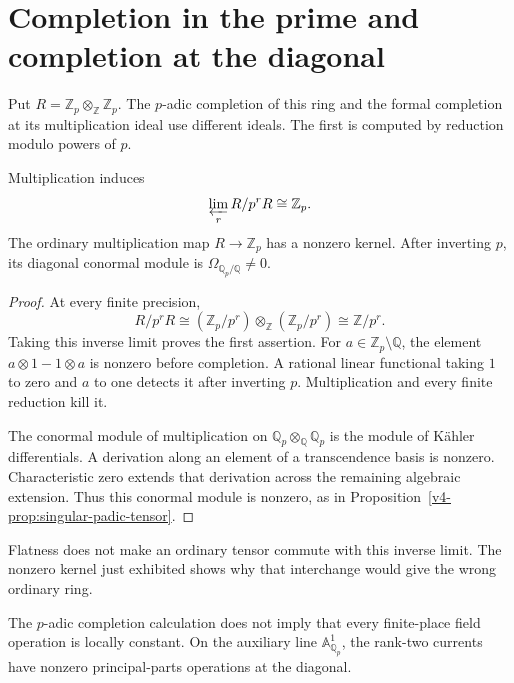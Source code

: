 \section{Completion in the prime and completion at the diagonal}
\label{v4-arith:dk:padic-diagonal-no-thickening}

Put \(R=\mathbb Z_p\otimes_{\mathbb Z}\mathbb Z_p\).
The \(p\)-adic completion of this ring and the formal completion
at its multiplication ideal use different ideals.
The first is computed by reduction modulo powers of \(p\).

\begin{proposition}\label{v4-arith:prop:padic-diagonal-collapse}
Multiplication induces
\[
        \varprojlim_r R/p^rR\cong\mathbb Z_p.
\]
The ordinary multiplication map \(R\to\mathbb Z_p\) has a
nonzero kernel. After inverting \(p\), its diagonal conormal
module is \(\Omega_{\mathbb Q_p/\mathbb Q}\ne0\).
\end{proposition}

\begin{proof}
At every finite precision,
\[
 R/p^rR\cong
     (\mathbb Z_p/p^r)\otimes_{\mathbb Z}(\mathbb Z_p/p^r)
                     \cong\mathbb Z/p^r.
\]
Taking this inverse limit proves the first assertion.
For \(a\in\mathbb Z_p\setminus\mathbb Q\), the element
\(a\otimes1-1\otimes a\) is nonzero before completion.
A rational linear functional taking \(1\) to zero and \(a\)
to one detects it after inverting \(p\).
Multiplication and every finite reduction kill it.

The conormal module of multiplication on
\(\mathbb Q_p\otimes_{\mathbb Q}\mathbb Q_p\) is the module
of Kähler differentials. A derivation along an element of a
transcendence basis is nonzero. Characteristic zero extends
that derivation across the remaining algebraic extension.
Thus this conormal module is nonzero, as in
Proposition~\ref{v4-prop:singular-padic-tensor}.
\end{proof}

Flatness does not make an ordinary tensor commute with this
inverse limit. The nonzero kernel just exhibited shows why
that interchange would give the wrong ordinary ring.

\begin{corollary}\label{v4-arith:cor:no-padic-ope}
The \(p\)-adic completion calculation does not imply that every
finite-place field operation is locally constant. On the auxiliary
line \(\mathbb A^1_{\mathbb Q_p}\), the rank-two currents have
nonzero principal-parts operations at the diagonal.
\end{corollary}

